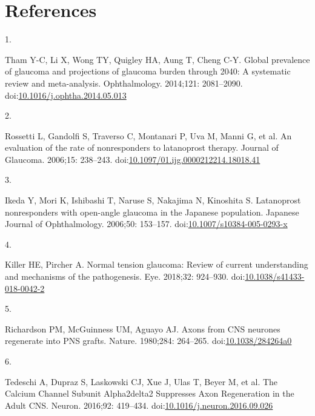 \documentclass[
  12pt,
  a4paper,
]{book}
\newlength{\cslhangindent}
\newlength{\csllabelwidth}
\newlength{\cslentryspacingunit} %
\newenvironment{CSLReferences}[2] %
 {%
  \setlength{\parindent}{0pt}
  \ifodd #1
  \let\oldpar\par
  \def\par{\hangindent=\cslhangindent\oldpar}
  \fi
  \setlength{\parskip}{#2\cslentryspacingunit}
 }%
 {}
\newcommand{\CSLLeftMargin}[1]{\parbox[t]{\csllabelwidth}{#1}}
\newcommand{\CSLRightInline}[1]{\parbox[t]{\linewidth - \csllabelwidth}{#1}\break}
\begin{document}
\hypertarget{BIB}{%
\chapter*{References}\label{BIB}}


\hypertarget{refs}{}
\begin{CSLReferences}{0}{0}
\leavevmode{}%
\CSLLeftMargin{1. }%
\CSLRightInline{Tham Y-C, Li X, Wong TY, Quigley HA, Aung T, Cheng C-Y. Global prevalence of glaucoma and projections of glaucoma burden through 2040: A systematic review and meta-analysis. Ophthalmology. 2014;121: 2081--2090. doi:\href{https://doi.org/10.1016/j.ophtha.2014.05.013}{10.1016/j.ophtha.2014.05.013}}

\leavevmode{}%
\CSLLeftMargin{2. }%
\CSLRightInline{Rossetti L, Gandolfi S, Traverso C, Montanari P, Uva M, Manni G, et al. An evaluation of the rate of nonresponders to latanoprost therapy. Journal of Glaucoma. 2006;15: 238--243. doi:\href{https://doi.org/10.1097/01.ijg.0000212214.18018.41}{10.1097/01.ijg.0000212214.18018.41}}

\leavevmode{}%
\CSLLeftMargin{3. }%
\CSLRightInline{Ikeda Y, Mori K, Ishibashi T, Naruse S, Nakajima N, Kinoshita S. Latanoprost nonresponders with open-angle glaucoma in the {Japanese} population. Japanese Journal of Ophthalmology. 2006;50: 153--157. doi:\href{https://doi.org/10.1007/s10384-005-0293-x}{10.1007/s10384-005-0293-x}}

\leavevmode{}%
\CSLLeftMargin{4. }%
\CSLRightInline{Killer HE, Pircher A. Normal tension glaucoma: Review of current understanding and mechanisms of the pathogenesis. Eye. 2018;32: 924--930. doi:\href{https://doi.org/10.1038/s41433-018-0042-2}{10.1038/s41433-018-0042-2}}

\leavevmode{}%
\CSLLeftMargin{5. }%
\CSLRightInline{Richardson PM, McGuinness UM, Aguayo AJ. Axons from {CNS} neurones regenerate into {PNS} grafts. Nature. 1980;284: 264--265. doi:\href{https://doi.org/10.1038/284264a0}{10.1038/284264a0}}

\leavevmode{}%
\CSLLeftMargin{6. }%
\CSLRightInline{Tedeschi A, Dupraz S, Laskowski CJ, Xue J, Ulas T, Beyer M, et al. The {Calcium Channel Subunit Alpha2delta2 Suppresses Axon Regeneration} in the {Adult CNS}. Neuron. 2016;92: 419--434. doi:\href{https://doi.org/10.1016/j.neuron.2016.09.026}{10.1016/j.neuron.2016.09.026}}


\end{CSLReferences}
\end{document}

